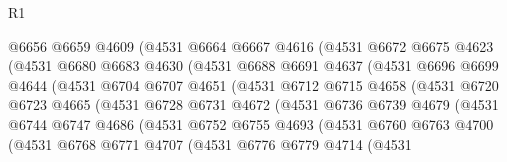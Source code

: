 \begin{lexlean}{R1}
\begin{coremodule}
                    @6656
                    @6659
                    @4609
                    (@4531
                      @6664
                      @6667
                      @4616
                      (@4531
                        @6672
                        @6675
                        @4623
                        (@4531
                          @6680
                          @6683
                          @4630
                          (@4531
                            @6688
                            @6691
                            @4637
                            (@4531
                              @6696
                              @6699
                              @4644
                              (@4531
                                @6704
                                @6707
                                @4651
                                (@4531
                                  @6712
                                  @6715
                                  @4658
                                  (@4531
                                    @6720
                                    @6723
                                    @4665
                                    (@4531
                                      @6728
                                      @6731
                                      @4672
                                      (@4531
                                        @6736
                                        @6739
                                        @4679
                                        (@4531
                                          @6744
                                          @6747
                                          @4686
                                          (@4531
                                            @6752
                                            @6755
                                            @4693
                                            (@4531
                                              @6760
                                              @6763
                                              @4700
                                              (@4531
                                                @6768
                                                @6771
                                                @4707
                                                (@4531
                                                  @6776
                                                  @6779
                                                  @4714
                                                  (@4531

\end{coremodule}
\end{lexlean}
